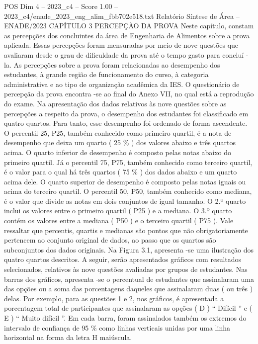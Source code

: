\begin{textsample}{POS Dim 4 – 2023\_c4 – Score 1.00 – 2023\_c4/enade\_2023\_eng\_alim\_fbb702e518.txt}  \label{ex:f4_pos_175}
Relatório Síntese de Área – ENADE/2023 CAPÍTULO 3 PERCEPÇÃO DA PROVA Neste capítulo, constam as percepções dos concluintes da área de Engenharia de Alimentos sobre a prova aplicada.
Essas percepções foram mensuradas por meio de nove questões que avaliaram desde o grau de dificuldade da prova até o tempo gasto para concluí -la.
As percepções sobre a prova foram relacionadas ao desempenho dos estudantes, à grande região de funcionamento do curso, à categoria administrativa e ao tipo de organização acadêmica da IES.
O questionário de percepção da prova encontra -se ao final do Anexo VII, no qual está a reprodução do exame.
Na apresentação dos dados relativos às nove questões sobre as percepções a respeito da prova, o desempenho dos estudantes foi classificado em quatro quartos.
Para tanto, esse desempenho foi ordenado de forma ascendente.
O percentil 25, P25, também conhecido como primeiro quartil, é a nota de desempenho que deixa um quarto ( 25 \% ) dos valores abaixo e três quartos acima.
O quarto inferior de desempenho é composto pelas notas abaixo do primeiro quartil.
Já o percentil 75, P75, também conhecido como terceiro quartil, é o valor para o qual há três quartos ( 75 \% ) dos dados abaixo e um quarto acima dele.
O quarto superior de desempenho é composto pelas notas iguais ou acima do terceiro quartil.
O percentil 50, P50, também conhecido como mediana, é o valor que divide as notas em dois conjuntos de igual tamanho.
O 2.º quarto inclui os valores entre o primeiro quartil ( P25 ) e a mediana.
O 3.º quarto contém os valores entre a mediana ( P50 ) e o terceiro quartil ( P75 ).
Vale ressaltar que percentis, quartis e medianas são pontos que não obrigatoriamente pertencem ao conjunto original de dados, ao passo que os quartos são subconjuntos dos dados originais.
Na Figura 3.1, apresenta -se uma ilustração dos quatro quartos descritos.
A seguir, serão apresentados gráficos com resultados selecionados, relativos às nove questões avaliadas por grupos de estudantes.
Nas barras dos gráficos, apresenta -se o percentual de estudantes que assinalaram uma das opções ou a soma das porcentagens daqueles que assinalaram duas ( ou três ) delas.
Por exemplo, para as questões 1 e 2, nos gráficos, é apresentada a porcentagem total de participantes que assinalaram as opções ( D ) “ Difícil ” e ( E ) “ Muito difícil ”.
Em cada barra, foram assinalados também os extremos do intervalo de confiança de 95 \% como linhas verticais unidas por uma linha horizontal na forma da letra H maiúscula.

\end{textsample}
